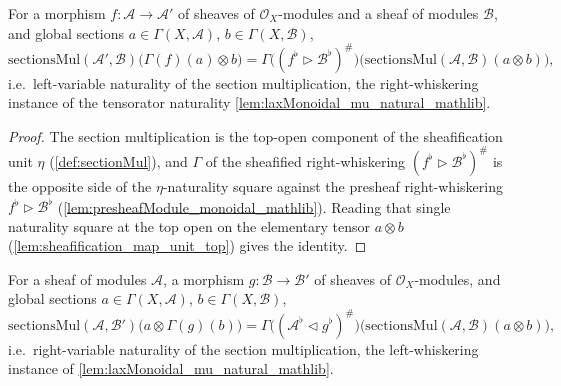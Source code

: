 \begin{lemma}
  \label{lem:sectionsMul_whiskerRight}
  For a morphism \(f : \mathcal{A} \to \mathcal{A}'\) of sheaves of
  \(\mathcal{O}_X\)-modules and a sheaf of modules \(\mathcal{B}\), and global
  sections \(a \in \Gamma(X,\mathcal{A})\), \(b \in \Gamma(X,\mathcal{B})\),
  \[
    \mathrm{sectionsMul}(\mathcal{A}',\mathcal{B})\bigl(\Gamma(f)(a) \otimes b\bigr)
      = \Gamma\bigl((f^{\flat} \rhd \mathcal{B}^{\flat})^{\#}\bigr)
        \bigl(\mathrm{sectionsMul}(\mathcal{A},\mathcal{B})(a \otimes b)\bigr),
  \]
  i.e.\ left-variable naturality of the section multiplication, the
  right-whiskering instance of the tensorator naturality
  \cref{lem:laxMonoidal_mu_natural_mathlib}.
\end{lemma}

\begin{proof}
  The section multiplication is the top-open component of the sheafification unit
  \(\eta\) (\cref{def:sectionMul}), and \(\Gamma\) of the sheafified
  right-whiskering \((f^{\flat} \rhd \mathcal{B}^{\flat})^{\#}\) is the opposite
  side of the \(\eta\)-naturality square against the presheaf right-whiskering
  \(f^{\flat} \rhd \mathcal{B}^{\flat}\)
  (\cref{lem:presheafModule_monoidal_mathlib}). Reading that single naturality
  square at the top open on the elementary tensor \(a \otimes b\)
  (\cref{lem:sheafification_map_unit_top}) gives the identity.
\end{proof}

\begin{lemma}
  \label{lem:sectionsMul_whiskerLeft}
  For a sheaf of modules \(\mathcal{A}\), a morphism \(g : \mathcal{B} \to
  \mathcal{B}'\) of sheaves of \(\mathcal{O}_X\)-modules, and global sections
  \(a \in \Gamma(X,\mathcal{A})\), \(b \in \Gamma(X,\mathcal{B})\),
  \[
    \mathrm{sectionsMul}(\mathcal{A},\mathcal{B}')\bigl(a \otimes \Gamma(g)(b)\bigr)
      = \Gamma\bigl((\mathcal{A}^{\flat} \lhd g^{\flat})^{\#}\bigr)
        \bigl(\mathrm{sectionsMul}(\mathcal{A},\mathcal{B})(a \otimes b)\bigr),
  \]
  i.e.\ right-variable naturality of the section multiplication, the
  left-whiskering instance of \cref{lem:laxMonoidal_mu_natural_mathlib}.
\end{lemma}

